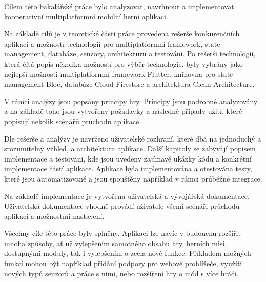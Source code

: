 \begin{conclusion}
Cílem této bakalářské práce bylo analyzovat, navrhnout a implementovat
kooperativní multiplatformní mobilní herní aplikaci. 

Na základě cílů je v teoretické části práce provedena rešerše
konkurenčních aplikací
a možností technologií pro multiplatformní framework, state management,
databáze, senzory, architekturu a testování.
Po rešerši technologií,
která čítá popis několika možností pro výběr technologie,
byly vybrány jako nejlepší možnosti
multiplatformní framework Flutter,
knihovna pro state management Bloc,
databáze Cloud Firestore
a architektura Clean Architecture.

V rámci analýzy jsou popsány principy hry.
Principy jsou podrobně analyzovány a na základě toho jsou vytvořeny
požadavky a následně případy užití,
které popisují nekolik scénářů průchodů aplikace.

Dle rešerše a analýzy je navrženo uživatelské rozhraní,
které dbá na jednoduchý a srozumitelný vzhled,
a architektura aplikace.
Další kapitoly se zabývájí popisem implementace a testování,
kde jsou uvedeny zajímavé ukázky kódu
a konkrétní implementace částí aplikace.
Aplikace byla implementována a otestována testy,
které jsou automatizované a jsou spouštěny například v rámci průběžné integrace.

Na základě implementace je vytvořena uživatelská a vývojářská dokumentace.
Uživatelská dokumentace vhodně provádí uživatele všemi scénáři průchodu
aplikací a možnostmi nastavení.

Všechny cíle této práce byly splněny.
Aplikaci lze navíc v budoucnu rozšířit mnoha způsoby,
ať už vylepšením samotného obsahu hry, herních misí, dostupnými moduly,
tak i vylepšením o zcela nové funkce.
Příkladem možných funkcí mohou být například
přidání podpory pro webové prohlížeče,
využití nových typů senzorů a práce s nimi,
nebo rozšíření hry o mód s více hráči.
\end{conclusion}
